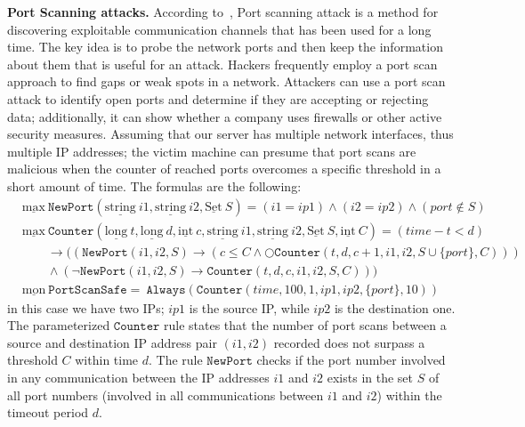 \documentclass[english]{article}
\begin{document}
\textbf{Port Scanning attacks.}
According to~\cite{kanlayasiri2000rule}, Port scanning attack is a method for discovering exploitable communication channels that has been used for a long time. The key idea is to probe the network ports and then keep the information about them that is useful for an attack.
Hackers frequently employ a port scan approach to find gaps or weak spots in a network. Attackers can use a port scan attack to identify open ports and determine if they are accepting or rejecting data; additionally, it can show whether a company uses firewalls or other active security measures. 
Assuming that our server has multiple network interfaces, thus multiple IP addresses; the victim machine can presume that port scans are malicious when the counter of reached ports overcomes a specific threshold in a short amount of time. The formulas are the following:
\begin{align*}
    & \underline{\text{max}}\ \mathtt{NewPort}(\underline{\text{string}}\ i1,\underline{\text{string}}\ i2,\underline{\text{Set}}\ S) = (i1=ip1)\land(i2=ip2)\land (port \notin S)\\
    & \underline{\text{max}}\ \mathtt{Counter}(\underline{\text{long}}\ t, \underline{\text{long}}\ d, \underline{\text{int}}\ c,\underline{\text{string}}\ i1,\underline{\text{string}}\ i2,\underline{\text{Set}}\ S,\underline{\text{int}}\ C) = (time-t<d)\\
    & \quad\quad\rightarrow((\mathtt{NewPort}(i1,i2,S)\rightarrow(c\leq C\land \bigcirc\mathtt{Counter}(t,d,c+1,i1,i2,S\cup\{port\},C)))  \\
    & \quad\quad\land(\neg \mathtt{NewPort}(i1,i2,S)\rightarrow\mathtt{Counter}(t,d,c,i1,i2,S,C))) \\
    & \underline{\text{mon}}\ \mathtt{PortScanSafe} =\ \mathtt{Always}(\mathtt{Counter}(time,100,1,ip1,ip2,\{port\},10)) 
\end{align*}
in this case we have two IPs; $ip1$ is the source IP, while $ip2$ is the destination one. The parameterized $\mathtt{Counter}$ rule states that the number of port scans between a source and destination IP  address pair $(i1,i2)$ recorded does not surpass a threshold $C$ within time $d$. The rule $\mathtt{NewPort}$ checks if the port number involved in any communication between the IP addresses $i1$ and $i2$ exists in the set $S$ of all port numbers (involved in all communications between $i1$ and $i2$) within the timeout period $d$.
\end{document}
